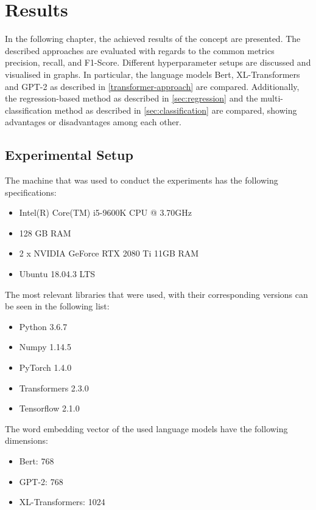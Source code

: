 \chapter{Results\label{cha:results}}

In the following chapter, the achieved results of the concept are presented. The described approaches are evaluated with regards to the common metrics precision, recall, and F1-Score. Different hyperparameter setups are discussed and visualised in graphs. In particular, the language models Bert, XL-Transformers and GPT-2 as described in \ref{transformer-approach} are compared. Additionally, the regression-based method as described in \ref{sec:regression} and the multi-classification method as described in \ref{sec:classification} are compared, showing advantages or disadvantages among each other.


\section{Experimental Setup}
The machine that was used to conduct the experiments has the following specifications:
\begin{itemize}
	\item Intel(R) Core(TM) i5-9600K CPU @ 3.70GHz
	\item 128 GB RAM
	\item 2 x NVIDIA GeForce RTX 2080 Ti 11GB RAM
	\item Ubuntu 18.04.3 LTS
\end{itemize}

\noindent The most relevant libraries that were used, with their corresponding versions can be seen in the following list:
\begin{itemize}
	\item Python 3.6.7
	\item Numpy 1.14.5
	\item PyTorch 1.4.0
	\item Transformers 2.3.0
	\item Tensorflow 2.1.0
\end{itemize}

\noindent The word embedding vector of the used language models have the following dimensions:
\begin{itemize}
	\item Bert: 768 
	\item GPT-2: 768
	\item XL-Transformers: 1024
\end{itemize}

